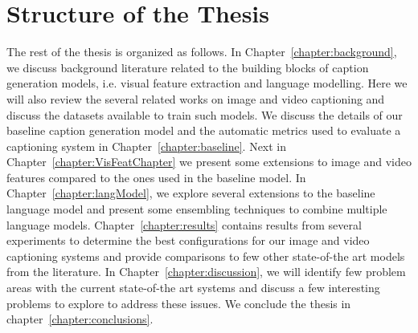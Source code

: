 \section{Structure of the Thesis}
\label{section:structure} 
The rest of the thesis is organized as follows.
In Chapter~\ref{chapter:background}, we discuss background literature related
to the building blocks of caption generation models, i.e. visual feature
extraction and language modelling. 
Here we will also review the several related works on image and video captioning
and discuss the datasets available to train such models.
We discuss the details of our baseline caption generation model and the
automatic metrics used to evaluate a captioning system in Chapter~\ref{chapter:baseline}. 
Next in Chapter~\ref{chapter:VisFeatChapter} we present some extensions to
image and video features compared to the ones used in the baseline model.
In Chapter~\ref{chapter:langModel}, we explore several extensions to the
baseline language model and present some ensembling techniques to combine
multiple language models.
Chapter~\ref{chapter:results} contains results from several experiments to
determine the best configurations for our image and video captioning systems and
provide comparisons to few other state-of-the art models from the literature.
In Chapter~\ref{chapter:discussion}, we will identify few problem areas with the
current state-of-the art systems and discuss a few interesting problems to
explore to address these issues.
We conclude the thesis in chapter~\ref{chapter:conclusions}.
